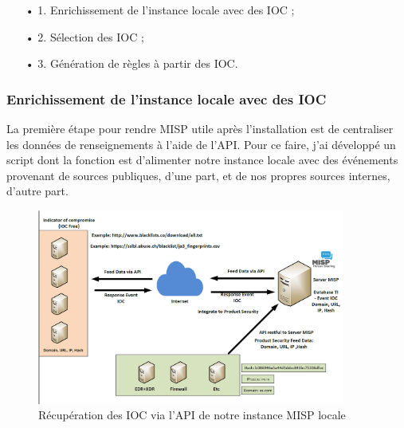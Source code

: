 \begin{itemize}[itemsep=0.75em]
    \item[•] 1. Enrichissement de l'instance locale avec des IOC ;
    \item[•] 2. Sélection des IOC ;
    \item[•] 3. Génération de règles à partir des IOC.\\
\end{itemize}

\newpage

\subsubsection{Enrichissement de l'instance locale avec des IOC}
\vspace{0.5em}

La première étape pour rendre MISP utile après l'installation est de centraliser les données de renseignements à l'aide de l'API. Pour ce faire, j'ai développé un script dont la fonction est d'alimenter notre instance locale avec des événements provenant de sources publiques, d'une part, et de nos propres sources internes, d'autre part.\\

\vspace{1em}

\begin{figure}[h]%
    \center%
    \includegraphics[width=0.9\textwidth]{assets/MispInfo.png}
    \caption[Récupération des IOC via l'API de notre instance MISP locale (source: \url{https://so-sonajaa.medium.com/misp-malware-information-sharing-platform-ep1-eea91df7415b})]{Récupération des IOC via l'API de notre instance MISP locale}\label{fig:MispInfo}
\end{figure}

\vspace{1em}

